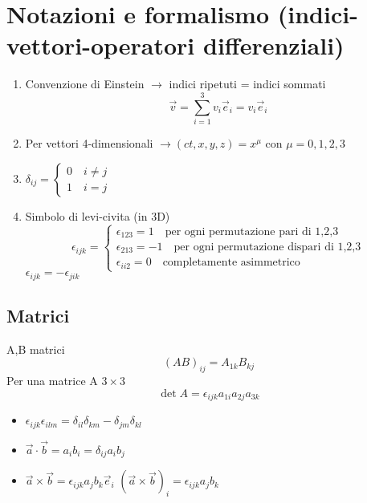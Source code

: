 \chapter{Notazioni e formalismo (indici-vettori-operatori differenziali)}

\begin{enumerate}
    \item Convenzione di Einstein $\rightarrow$ indici ripetuti = indici sommati
    \begin{equation*}
        \vec{v} = \sum_{i=1}^3 v_i\vec{e}_i = v_i\vec{e}_i
    \end{equation*}
    \item Per vettori 4-dimensionali $\rightarrow (ct,x,y,z) = x^\mu$ con $\mu =0,1,2,3$
    \item $\delta_{ij}=
    \begin{cases}
        0 \quad i \ne j \\
        1 \quad i = j 
    \end{cases}$
    \item Simbolo di levi-civita (in 3D)
    \begin{equation*}
        \epsilon_{ijk} = \begin{cases}
            \epsilon_{123} = 1 \quad \text{per ogni permutazione pari di 1,2,3} \\
            \epsilon_{213} = -1 \quad \text{per ogni permutazione dispari di 1,2,3} \\
            \epsilon_{ii2} = 0 \quad \text{completamente asimmetrico}
        \end{cases}
    \end{equation*}
    $\epsilon_{ijk} = - \epsilon_{jik}$
\end{enumerate}

\section*{Matrici}
A,B matrici
\begin{equation*}
    {(AB)}_{ij} = A_{1k}B_{kj}
\end{equation*}
Per una matrice A $3 \times 3$ 
\begin{equation*}
    \det A = \epsilon_{ijk} a_{1i}a_{2j}a_{3k}
\end{equation*}

\begin{itemize}
    \item $\epsilon_{ijk}\epsilon_{ilm} = \delta_{il}\delta_{km} - \delta_{jm}\delta_{kl}$
    \item $\vec{a}\cdot \vec{b} = a_ib_i = \delta_{ij}a_ib_j$
    \item $\vec{a}\times \vec{b} = \epsilon_{ijk}a_jb_k\vec{e}_i$ \newline
    ${(\vec{a}\times \vec{b})}_i = \epsilon_{ijk}a_jb_k$
\end{itemize}

